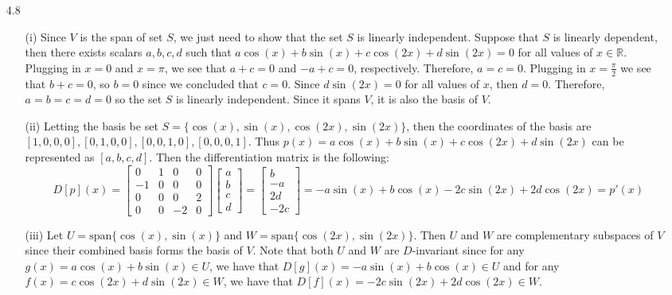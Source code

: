 \documentclass[letterpaper,12pt]{article}
\theoremstyle{definition}
\begin{document}
\begin{enumerate}
  \item[4.8]
    \begin{enumerate}
      \item[(i)]
        Since $V$ is the span of set $S$, we just need to show that the set $S$ is linearly independent. Suppose that $S$ is linearly dependent, then there exists scalars $a, b, c, d$ such that $a\cos(x)+b\sin(x)+c\cos(2x)+d\sin(2x)=0$ for all values of $x \in \mathbb{R}$. Plugging in $x=0$ and $x=\pi$, we see that $a+c=0$ and $-a+c=0$, respectively. Therefore, $a=c=0$. Plugging in $x=\frac{\pi}{2}$ we see that $b+c=0$, so $b=0$ since we concluded that $c=0$. Since $d\sin(2x)=0$ for all values of $x$, then $d=0$. Therefore, $a=b=c=d=0$ so the set $S$ is linearly independent. Since it spans $V$, it is also the basis of $V$.
      \item[(ii)]
      Letting the basis be set $S=\{\cos(x),\sin(x),\cos(2x),\sin(2x)\}$, then the coordinates of the basis are $[1,0,0,0], [0,1,0,0], [0,0,1,0],[0,0,0,1]$. Thus $p(x) = a\cos(x) + b\sin(x) + c\cos(2x)+d\sin(2x)$ can be represented as $[a, b, c, d]$. Then the differentiation matrix is the following:
            \[
              D[p](x) =
              \begin{bmatrix}
                0 & 1 & 0 & 0 \\
                -1 & 0 & 0 & 0 \\
                0 & 0 & 0 & 2 \\
                0 & 0 & -2 & 0
              \end{bmatrix}
              \begin{bmatrix}
                a \\
                b \\
                c \\
                d
              \end{bmatrix}
              =
              \begin{bmatrix}
                b \\
                -a \\
                2d \\
                -2c
              \end{bmatrix}
              = -a\sin(x) + b\cos(x) - 2c\sin(2x) + 2d\cos(2x) = p'(x)
            \]
      \item[(iii)]
      Let $U = \text{span}\{\cos(x),\sin(x)\}$ and $W = \text{span}\{\cos(2x),\sin(2x)\}$. Then $U$ and $W$ are complementary subspaces of $V$ since their combined basis forms the basis of $V$. Note that both $U$ and $W$ are $D$-invariant since for any $g(x) = a\cos(x)+b\sin(x) \in U$, we have that $D[g](x) = -a\sin(x)+b\cos(x) \in U$ and for any $f(x)=c\cos(2x)+d\sin(2x) \in W$, we have that $D[f](x)=-2c\sin(2x)+2d\cos(2x) \in W$.

\end{enumerate}
\end{enumerate}
\end{document}

